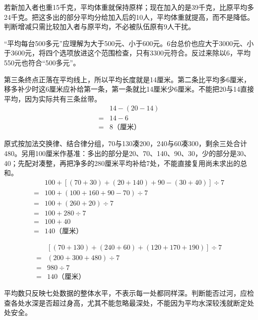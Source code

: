 \documentclass[multi=snippet,border=0pt]{standalone}
\newenvironment{snippet}[3]{\begin{minipage}{#1bp}\color{answerred}\fontsize{#2}{#3}\selectfont\raggedright}{\end{minipage}}
\begin{document}
\begin{snippet}{505}{11.5}{14}若新加入者也重15千克，平均体重就保持原样；现在加入的是39千克，比原平均多24千克。把这多出的部分平均分给加入后的10人，平均体重就提高，而不是降低。判断增减只需比较加入者与原平均，不必被队伍原有9人干扰。\end{snippet}
\begin{snippet}{505}{11.5}{14}“平均每台500多元”应理解为大于500元、小于600元。6台总价也应大于3000元、小于3600元，将四个选项放进这个范围检查，只有3300元符合。反过来除以6，平均550元也符合“500多元”。\end{snippet}
\begin{snippet}{505}{11.5}{14}第三条终点正落在平均线上，所以平均长度就是14厘米。第二条比平均多6厘米，移多补少时这6厘米应补给第一条，第一条就比14厘米少6厘米。不能把20与14直接平均，因为实际共有三条丝带。\[\begin{aligned}&14-(20-14)\\={}&14-6\\={}&8\text{（厘米）}\end{aligned}\]\end{snippet}
\begin{snippet}{505}{11.5}{14}原式按加法交换律、结合律分组，70与130凑200，240与60凑300，剩余三处合计480。另用100厘米作基准：多出的部分是20、70、140、90、30，少的部分是30、40；先配对凑整，再把净多的280厘米平均补给7处，不能直接复用尚未求出的总和。\[\begin{aligned}&100+[(70+30)+(20+140)+90-(30+40)]\div7\\={}&100+(100+160+90-70)\div7\\={}&100+(260+20)\div7\\={}&100+280\div7\\={}&100+40\\={}&140\text{（厘米）}\end{aligned}\]\end{snippet}
\begin{snippet}{369}{10.5}{12.8}\[\begin{aligned}&[(70+130)+(240+60)+(120+170+190)]\div7\\={}&(200+300+480)\div7\\={}&980\div7\\={}&140\text{（厘米）}\end{aligned}\]\end{snippet}
\begin{snippet}{505}{11.5}{14}平均数只反映七处数据的整体水平，不表示每一处都同样深。判断能否过河，应检查各处水深是否超过身高，尤其不能忽略最深处，不能因为平均水深较浅就断定处处安全。\end{snippet}
\end{document}
